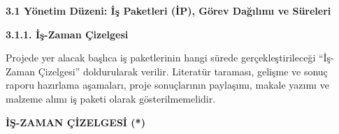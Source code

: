 \begin{landscape}
\thispagestyle{mylandscape} %

\vspace*{0.1in}
\noindent\textbf{3.1 Yönetim Düzeni: İş Paketleri (İP), Görev Dağılımı ve Süreleri}

\vspace*{0.1in}
\noindent\textbf{3.1.1. İş-Zaman Çizelgesi}

\vspace*{0.1in}
Projede yer alacak başlıca iş paketlerinin hangi sürede gerçekleştirileceği ``İş-Zaman Çizelgesi'' doldurularak verilir. Literatür taraması, gelişme ve sonuç raporu hazırlama aşamaları, proje sonuçlarının paylaşımı, makale yazımı ve malzeme alımı iş paketi olarak gösterilmemelidir.

\begin{center}
\textbf{İŞ-ZAMAN ÇİZELGESİ (*)    }
\end{center}



\end{landscape}
